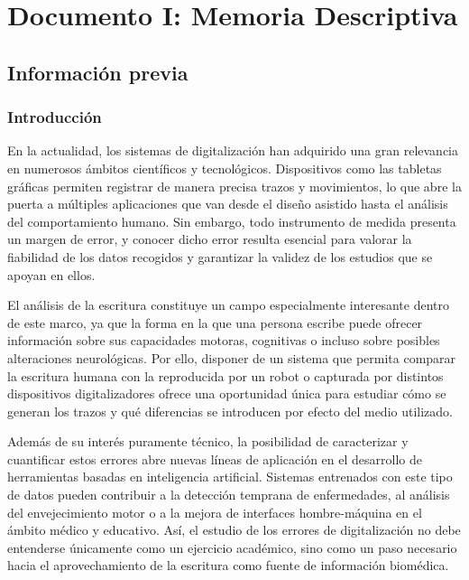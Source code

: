 \documentclass[12pt,a4paper,oneside]{report}
\begin{document}
\tableofcontents
\clearpage
\listoffigures
\clearpage
\listoftables
\clearpage
{}

\chapter{Documento I: Memoria Descriptiva}
\clearpage

\section{Información previa}\label{sec:info-previa}

\subsection{Introducción}


En la actualidad, los sistemas de digitalización han adquirido una gran relevancia en numerosos ámbitos científicos y tecnológicos. 
Dispositivos como las tabletas gráficas permiten registrar de manera precisa trazos y movimientos, lo que abre la puerta a múltiples 
aplicaciones que van desde el diseño asistido hasta el análisis del comportamiento humano. Sin embargo, todo instrumento de medida 
presenta un margen de error, y conocer dicho error resulta esencial para valorar la fiabilidad de los datos recogidos y garantizar 
la validez de los estudios que se apoyan en ellos.  

El análisis de la escritura constituye un campo especialmente interesante dentro de este marco, ya que la forma en la que una persona 
escribe puede ofrecer información sobre sus capacidades motoras, cognitivas o incluso sobre posibles alteraciones neurológicas. 
Por ello, disponer de un sistema que permita comparar la escritura humana con la reproducida por un robot o capturada por distintos 
dispositivos digitalizadores ofrece una oportunidad única para estudiar cómo se generan los trazos y qué diferencias se introducen 
por efecto del medio utilizado.  

Además de su interés puramente técnico, la posibilidad de caracterizar y cuantificar estos errores abre nuevas líneas de aplicación 
en el desarrollo de herramientas basadas en inteligencia artificial. Sistemas entrenados con este tipo de datos pueden contribuir 
a la detección temprana de enfermedades, al análisis del envejecimiento motor o a la mejora de interfaces hombre-máquina en el ámbito 
médico y educativo. Así, el estudio de los errores de digitalización no debe entenderse únicamente como un ejercicio académico, 
sino como un paso necesario hacia el aprovechamiento de la escritura como fuente de información biomédica.  
\end{document}
